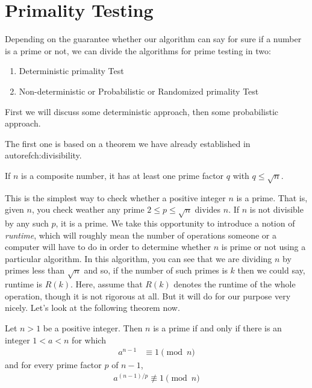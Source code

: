 \documentclass{subfiles}
\begin{document}
\section{Primality Testing}\label{sec:primalitytesting}
	Depending on the guarantee whether our algorithm can say for sure if a number is a prime or not, we can divide the algorithms for prime testing in two:
		\begin{enumerate}
			\item Deterministic primality Test
			\item Non-deterministic or Probabilistic or Randomized primality Test
		\end{enumerate}
	First we will discuss some deterministic approach, then some probabilistic approach.

	The first one is based on a theorem we have already established in autoref{ch:divisibility}.
		\begin{theorem} \label{thm:trialdivision}
			If $n$ is a composite number, it has at least one prime factor $q$ with $q\leq\sqrt{n}$.
		\end{theorem}
	This is the simplest way to check whether a positive integer $n$ is a prime. That is, given $n$, you check weather any prime $2 \leq p \leq \sqrt n$ divides $n$. If $n$ is not divisible by any such $p$, it is a prime. We take this opportunity to introduce a notion of \textit{runtime}, which will roughly mean the number of operations someone or a computer will have to do in order to determine whether $n$ is prime or not using a particular algorithm. In this algorithm, you can see that we are dividing $n$ by primes less than $\sqrt{n}$ and so, if the number of such primes is $k$ then we could say, runtime is $R(k)$. Here, assume that $R(k)$ denotes the runtime of the whole operation, though it is not rigorous at all. But it will do for our purpose very nicely. Let's look at the following theorem now.
		\begin{theorem}
			\label{thm:lucastest}
			Let $n >1$ be a positive integer. Then $n$ is a prime if and only if there is an integer $1<a<n$ for which
				\begin{align*}
					a^{n-1} &\equiv1\pmod n
				\end{align*}
			and for every prime factor $p$ of $n-1$,
				\begin{align*}
					a^{(n-1)/p} \not \equiv 1 \pmod n
				\end{align*}
		\end{theorem}
\end{document}
